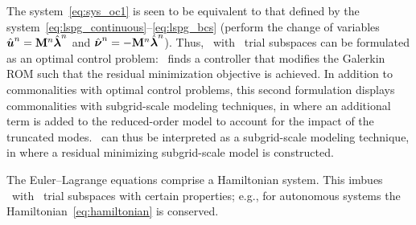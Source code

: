 The system~\eqref{eq:sys_oc1} is seen to be equivalent to that defined by the system~\eqref{eq:lspg_continuous}--\eqref{eq:lspg_bcs} (perform 
the change of variables ${\hat{\boldsymbol u}^{n}} = \mathbf{M}^{n} \hat{\boldsymbol \lambda}^{n}$ and $\hat{\boldsymbol \nu}^{n} = -\mathbf{M}^{n} \hat{\boldsymbol \lambda}^{n}$).  
Thus, \methodAcronym\ with \spatialAcronym\ trial subspaces can be formulated as an optimal control problem: \methodAcronym\ finds a controller that modifies the Galerkin ROM such that the residual minimization objective is achieved. In addition to commonalities with optimal control problems, this second formulation displays commonalities with subgrid-scale modeling techniques, in where an additional term is added to the reduced-order model to account for the impact of the truncated modes. \methodAcronym\ can thus be interpreted as a subgrid-scale modeling technique, in where a residual minimizing subgrid-scale model is constructed.

\begin{remark}
The Euler--Lagrange equations comprise a Hamiltonian system. This imbues \methodAcronym\ with \spatialAcronym\ trial subspaces with certain properties; e.g., for autonomous systems the Hamiltonian~\eqref{eq:hamiltonian} is conserved. 
\end{remark} 

